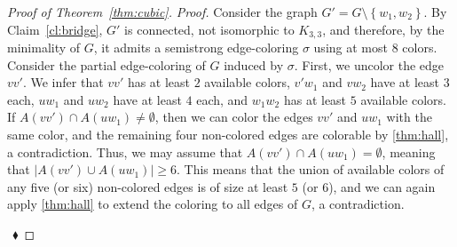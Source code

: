 \documentclass[12pt,a4paper]{article}
\newcommand{\set}[1]{\ensuremath{\left\{#1 \right\}}}
\newenvironment{proofclaim}[1][]%
    {\noindent \emph{Proof.} {}{#1}{}}{$~$\hfill $~\blacklozenge$ \vspace{0.2cm}}
\begin{document}
\begin{proof}[Proof of Theorem~\ref{thm:cubic}]
\begin{proofclaim}
		Consider the graph $G' = G \setminus \set{w_1,w_2}$.
		By Claim~\ref{cl:bridge}, $G'$ is connected, not isomorphic to $K_{3,3}$, and therefore, by the minimality of $G$,
		it admits a semistrong edge-coloring $\sigma$ using at most $8$ colors.
		Consider the partial edge-coloring of $G$ induced by $\sigma$.
		First, we uncolor the edge $vv'$.
		We infer that $vv'$ has at least $2$ available colors,
		$v'w_1$ and $vw_2$ have at least $3$ each,
		$uw_1$ and $uw_2$ have at least $4$ each,
		and $w_1w_2$ has at least $5$ available colors.
		If $A(vv') \cap A(uw_1) \neq \emptyset$, then we can color the edges $vv'$ and $uw_1$ with the same color,
		and the remaining four non-colored edges are colorable by \cref{thm:hall}, a contradiction.
		Thus, we may assume that $A(vv') \cap A(uw_1) = \emptyset$, 
		meaning that $|A(vv') \cup A(uw_1)| \ge 6$. 
		This means that the union of available colors of any five (or six) non-colored edges is of size at least $5$ (or $6$),
		and we can again apply \cref{thm:hall} to extend the coloring to all edges of $G$, a contradiction.		
%		

\end{proofclaim}
\end{proof}
\end{document}
